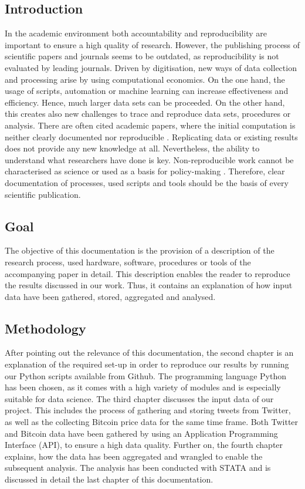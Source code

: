 \documentclass[a4paper,12pt]{article}
\begin{document}
\clearpage

\begin{spacing}{1.2}
\cleardoublepage{}

\section{Introduction}
In the academic environment both accountability and reproducibility are important to ensure a high quality of research. However, the publishing process of scientific papers and journals seems to be outdated, as reproducibility is not evaluated by leading journals. \parencite[p.~888]{mccullough2003} Driven by digitisation, new ways of data collection and processing arise by using computational economics. On the one hand, the usage of scripts, automation or machine learning can increase effectiveness and efficiency. Hence, much larger data sets can be proceeded. On the other hand, this creates also new challenges to trace and reproduce data sets, procedures or analysis. There are often cited academic papers, where the initial computation is neither clearly documented nor reproducible \parencite[pp.~874--887]{mccullough2003}. Replicating data or existing results does not provide any new knowledge at all. Nevertheless, the ability to understand what researchers have done is key. Non-reproducible work cannot be characterised as science or used as a basis for policy-making \parencite[p.~888]{mccullough2003}. Therefore, clear documentation of processes, used scripts and tools should be the basis of every scientific publication.

\subsection{Goal}
The objective of this documentation is the provision of a description of the research process, used hardware, software, procedures or tools of the accompanying paper in detail. This description enables the reader to reproduce the results discussed in our work. Thus, it contains an explanation of how  input data have been gathered, stored, aggregated and analysed. 

\subsection{Methodology}
After pointing out the relevance of this documentation, the second chapter is an explanation of the required set-up in order to reproduce our results by running our Python scripts available from Github. The programming language Python has been chosen, as it comes with a high variety of modules and is especially suitable for data science. The third chapter discusses the input data of our project. This includes the process of gathering and storing tweets from Twitter, as well as the collecting Bitcoin price data for the same time frame. Both Twitter and Bitcoin data have been gathered by using an Application Programming Interface (API), to ensure a high data quality. Further on, the fourth chapter explains, how the data has been aggregated and wrangled to enable the subsequent analysis. The analysis has been conducted with STATA and is discussed in detail the last chapter of this documentation.


\end{spacing}
\end{document}

